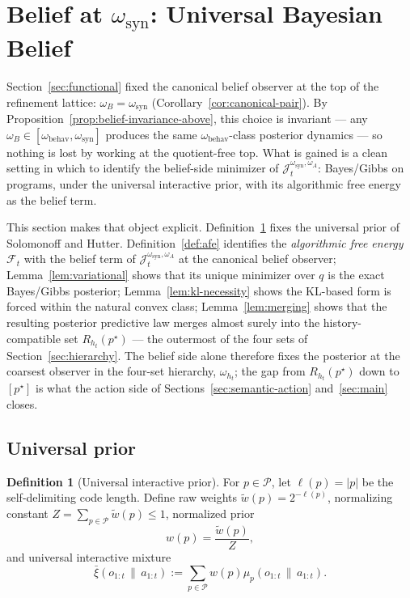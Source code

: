 \documentclass[11pt]{article}
\theoremstyle{definition}
\newtheorem{definition}[theorem]{Definition}
\theoremstyle{remark}
\newcommand{\Pcal}{\mathcal{P}}
\newcommand{\Fcal}{\mathcal{F}}
\newcommand{\givena}{\,\|\,}
\newcommand{\ellp}{\ell}
\newcommand{\wt}{\widetilde}
\newcommand{\barxi}{\bar{\xi}}
\begin{document}
\section{Belief at $\omega_{\mathrm{syn}}$: Universal Bayesian Belief}
\label{sec:belief}

Section~\ref{sec:functional} fixed the canonical belief observer at the top of the refinement lattice: $\omega_B=\omega_{\mathrm{syn}}$ (Corollary~\ref{cor:canonical-pair}). By Proposition~\ref{prop:belief-invariance-above}, this choice is invariant --- any $\omega_B\in[\omega_{\mathrm{behav}},\omega_{\mathrm{syn}}]$ produces the same $\omega_{\mathrm{behav}}$-class posterior dynamics --- so nothing is lost by working at the quotient-free top. What is gained is a clean setting in which to identify the belief-side minimizer of $\mathcal J_t^{\omega_{\mathrm{syn}},\omega_A}$: Bayes/Gibbs on programs, under the universal interactive prior, with its algorithmic free energy as the belief term.

This section makes that object explicit. Definition~\ref{def:universal-prior} fixes the universal prior of Solomonoff and Hutter. Definition~\ref{def:afe} identifies the \emph{algorithmic free energy} $\Fcal_t$ with the belief term of $\mathcal J_t^{\omega_{\mathrm{syn}},\omega_A}$ at the canonical belief observer; Lemma~\ref{lem:variational} shows that its unique minimizer over $q$ is the exact Bayes/Gibbs posterior; Lemma~\ref{lem:kl-necessity} shows the KL-based form is forced within the natural convex class; Lemma~\ref{lem:merging} shows that the resulting posterior predictive law merges almost surely into the history-compatible set $R_{h_t}(p^\star)$ --- the outermost of the four sets of Section~\ref{sec:hierarchy}. The belief side alone therefore fixes the posterior at the coarsest observer in the four-set hierarchy, $\omega_{h_t}$; the gap from $R_{h_t}(p^\star)$ down to $[p^\star]$ is what the action side of Sections~\ref{sec:semantic-action} and~\ref{sec:main} closes.

\subsection{Universal prior}

\begin{definition}[Universal interactive prior]
\label{def:universal-prior}
For $p\in\Pcal$, let $\ellp(p)=|p|$ be the self-delimiting code length. Define raw weights $\wt w(p)=2^{-\ellp(p)}$, normalizing constant $Z=\sum_{p\in\Pcal}\wt w(p)\le 1$, normalized prior
\[
w(p)=\frac{\wt w(p)}{Z},
\]
and universal interactive mixture
\[
\barxi(o_{1:t}\givena a_{1:t})
:=
\sum_{p\in\Pcal} w(p)\mu_p(o_{1:t}\givena a_{1:t}).
\]
\end{definition}
\end{document}
